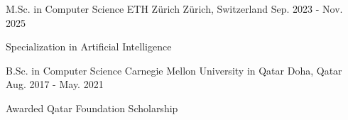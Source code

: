 

\begin{cventries}

\cventry
{M.Sc. in Computer Science} %
{ETH Zürich} %
{Zürich, Switzerland} %
{Sep. 2023 - Nov. 2025} %
{
  \begin{cvitems} %
    \item {Specialization in Artificial Intelligence}
  \end{cvitems}
}

\cventry
{B.Sc. in Computer Science} %
{Carnegie Mellon University in Qatar} %
{Doha, Qatar} %
{Aug. 2017 - May. 2021} %
{
  \begin{cvitems} %
    \item {Awarded Qatar Foundation Scholarship}
  \end{cvitems}
}

\end{cventries}
